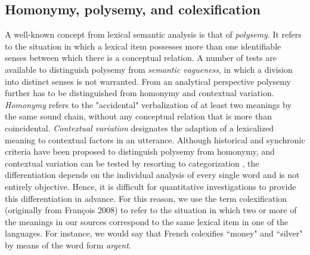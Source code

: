 \subsection{Homonymy, polysemy, and colexification}
A well-known concept from lexical semantic analysis is that of \emph{polysemy}. It refers to the situation
in which a lexical item possesses more than one identifiable senses between which there is a
conceptual relation. A number of tests are available to distinguish polysemy from \emph{semantic
vagueness}, in which a division into distinct senses is not warranted. From an analytical perspective
polysemy further has to be distinguished from {homonymy} and contextual variation.
\emph{Homonymy} refers to
the "accidental" verbalization of at least two meanings by the same sound chain, without any
conceptual relation that is more than coincidental. \emph{Contextual variation}
designates the adaption of a lexicalized meaning to contextual factors in an utterance. Although
historical and synchronic criteria have been proposed to distinguish polysemy from homonymy, and
contextual variation can be tested by resorting to categorization \cite{blank1997}, the
differentiation depends on the individual analysis of every single word and is not entirely
objective. Hence, it is difficult for quantitative investigations to provide this differentiation
in advance.
For this reason, we use the term colexification (originally from Fran\c{c}ois 2008)
\nocite{francois2008}
to refer to the situation
in which two or more of the meanings in our sources correspond to the same lexical item in one of
the languages. For instance, we would say that French colexifies ``money" and ``silver" by means of the word form \textit{argent}.
